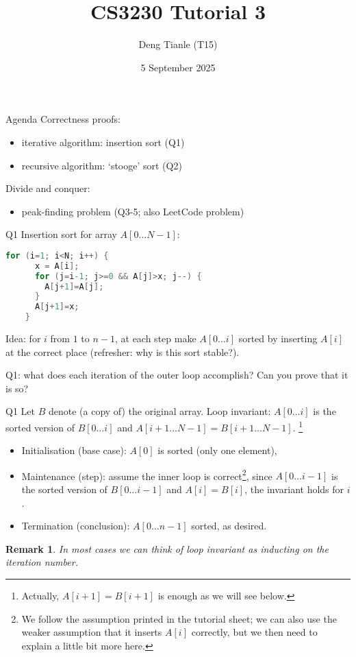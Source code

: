 \documentclass{scratcl}
\title{CS3230 Tutorial 3}
\author{Deng Tianle (T15)}
\date{5 September 2025}
\newtheorem{remark}{Remark}
\begin{document}
\frame{\titlepage} 

\begin{frame}{Agenda}
  Correctness proofs:
  \begin{itemize}
    \item iterative algorithm: insertion sort (Q1)
    \item recursive algorithm: `stooge' sort (Q2)
  \end{itemize}
  Divide and conquer:
  \begin{itemize}
    \item peak-finding problem (Q3-5; also LeetCode problem)
  \end{itemize}
\end{frame}
\begin{frame}[fragile]{Q1}
  Insertion sort for array $A[0\dots N-1]$:
  \begin{lstlisting}[language=C]
    for (i=1; i<N; i++) {
      x = A[i];
      for (j=i-1; j>=0 && A[j]>x; j--) {
        A[j+1]=A[j];
      }
      A[j+1]=x;
    }
  \end{lstlisting}
  Idea: for $i$ from $1$ to $n-1$, at each step make $A[0 \dots i]$ sorted by inserting $A[i]$ at the correct place (refresher: why is this sort stable?). 
  \par Q1: what does each iteration of the outer loop accomplish? Can you prove that it is so? 
\end{frame}
\begin{frame}{Q1}
  Let $B$ denote (a copy of) the original array. Loop invariant: $A[0 \dots i]$ is the sorted version of $B[0 \dots i]$ and $A[i+1 \dots N-1] = B[i+1 \dots N-1]$. \footnote{Actually, $A[i+1]=B[i+1]$ is enough as we will see below. } 
  \begin{itemize}
    \item Initialisation (base case): $A[0]$ is sorted (only one element), 
    \item Maintenance (step): assume the inner loop is correct\footnote{We follow the assumption printed in the tutorial sheet; we can also use the weaker assumption that it inserts $A[i]$ correctly, but we then need to explain a little bit more here. }, since $A[0 \dots i-1]$ is the sorted version of $B[0 \dots i-1]$ and $A[i]=B[i]$, the invariant holds for $i$. 
    \item Termination (conclusion): $A[0\dots n-1]$ sorted, as desired.
  \end{itemize}
  \begin{remark}
    In most cases we can think of loop invariant as inducting on the iteration number. 
  \end{remark}
\end{frame}
\end{document}
